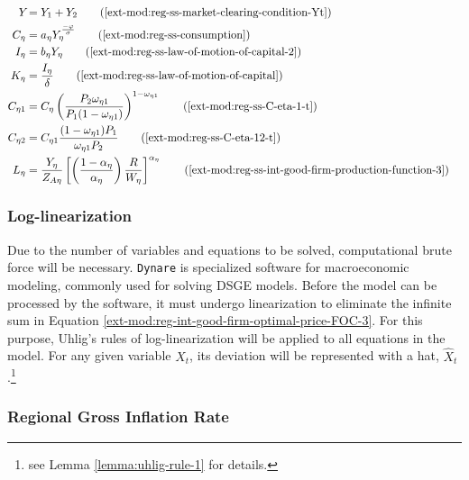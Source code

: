 \documentclass[../thesis.tex]{subfiles}
\begin{document}
\begin{align}
		\\
		Y_{} &= Y_{1} + Y_{2} \tag{\ref{ext-mod:reg-ss-market-clearing-condition-Yt}} 
		\\
		C_{\eta} &= a_{\eta} Y_{\eta}^{\frac{-\varphi}{\sigma}} \tag{\ref{ext-mod:reg-ss-consumption}}
		\\
		I_{\eta} &= b_{\eta} Y_{\eta} \tag{\ref{ext-mod:reg-ss-law-of-motion-of-capital-2}}
		\\
		K_{\eta} &= \frac{I_{\eta}}{\delta} \tag{\ref{ext-mod:reg-ss-law-of-motion-of-capital}}
		\\
		C_{\eta 1} &= C_{\eta} \left( \frac{P_{2} \omega_{\eta 1}}{P_{1} (1 - \omega_{\eta 1})} \right)^{1-\omega_{\eta 1}} \tag{\ref{ext-mod:reg-ss-C-eta-1-t}} 
		\\
		C_{\eta 2} &= C_{\eta 1} \frac{(1 - \omega_{\eta 1}) P_{1}}{\omega_{\eta 1} P_{2}} \tag{\ref{ext-mod:reg-ss-C-eta-12-t}} 
		\\
		L_{\eta} &= \frac{Y_{\eta}}{Z_{A\eta}} \left[ \left( \frac{1-\alpha_{\eta}}{{\alpha_{\eta}}} \right) \frac{R}{W_{\eta}} \right]^{\alpha_{\eta}} \tag{\ref{ext-mod:reg-ss-int-good-firm-production-function-3}}
	\end{align}

	\newpage
	
	
\subsubsection{Log-linearization}
	
Due to the number of variables and equations to be solved, computational brute force will be necessary. \texttt{Dynare} is specialized software for macroeconomic modeling, commonly used for solving DSGE models. Before the model can be processed by the software, it must undergo linearization to eliminate the infinite sum in Equation \ref{ext-mod:reg-int-good-firm-optimal-price-FOC-3}. For this purpose, Uhlig's rules of log-linearization \cite{uhlig_toolkit_1999} will be applied to all equations in the model. For any given variable $X_{t}$, its deviation will be represented with a hat, $\hat{X}_{t}$.\footnote{see Lemma \ref{lemma:uhlig-rule-1} for details.}


\subsubsection*{Regional Gross Inflation Rate}
\end{document}
